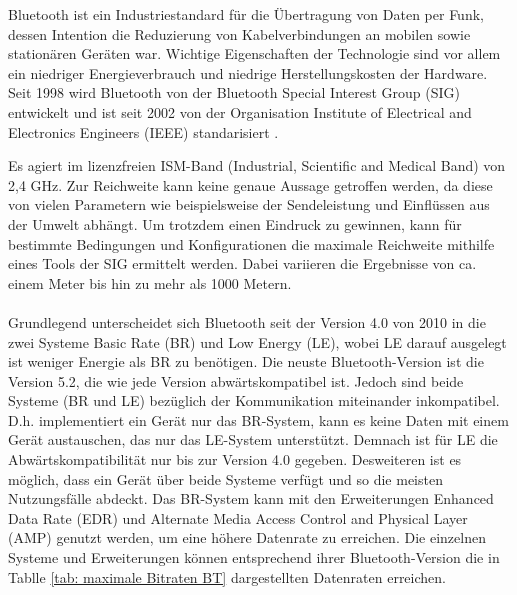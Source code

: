 Bluetooth ist ein Industriestandard für die Übertragung von Daten per Funk, dessen Intention die Reduzierung von Kabelverbindungen an mobilen sowie stationären Geräten war. Wichtige Eigenschaften der Technologie sind vor allem ein niedriger Energieverbrauch und niedrige Herstellungskosten der Hardware. Seit 1998 wird Bluetooth von der Bluetooth Special Interest Group (SIG) entwickelt und ist seit 2002 von der Organisation Institute of Electrical and Electronics Engineers (IEEE) standarisiert \cite{IEEE}.

Es agiert im lizenzfreien ISM-Band (Industrial, Scientific and Medical Band) von 2,4 GHz. 
Zur Reichweite kann keine genaue Aussage getroffen werden, da diese von vielen Parametern wie beispielsweise der Sendeleistung und Einflüssen aus der Umwelt abhängt. Um trotzdem einen Eindruck zu gewinnen, kann für bestimmte Bedingungen und Konfigurationen die maximale Reichweite mithilfe eines Tools \cite{BtRangeTool} der SIG ermittelt werden. Dabei variieren die Ergebnisse von ca. einem Meter bis hin zu mehr als 1000 Metern.
\\\\
Grundlegend unterscheidet sich Bluetooth seit der Version 4.0 von 2010 in die zwei Systeme Basic Rate (BR) und Low Energy (LE), wobei LE darauf ausgelegt ist weniger Energie als BR zu benötigen. Die neuste Bluetooth-Version ist die Version 5.2, die wie jede Version abwärtskompatibel ist. Jedoch sind beide Systeme (BR und LE) bezüglich der Kommunikation miteinander inkompatibel. D.h. implementiert ein Gerät nur das BR-System, kann es keine Daten mit einem Gerät austauschen, das nur das LE-System unterstützt. Demnach ist für LE die Abwärtskompatibilität nur bis zur Version 4.0 gegeben. Desweiteren ist es möglich, dass ein Gerät über beide Systeme verfügt und so die meisten Nutzungsfälle abdeckt. Das BR-System kann mit den Erweiterungen Enhanced Data Rate (EDR) und Alternate Media Access Control and Physical Layer (AMP) genutzt werden, um eine höhere Datenrate zu erreichen. Die einzelnen Systeme und Erweiterungen können entsprechend ihrer Bluetooth-Version die in Tablle \ref{tab: maximale Bitraten BT} dargestellten Datenraten erreichen.\\

